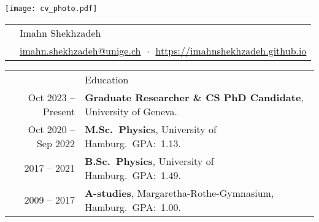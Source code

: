 \documentclass[11pt, a4paper]{article}
\newcommand{\headingfont}{\Large\color{OliveGreen}}
\newenvironment{SectionTable}[1]{
	\renewcommand*{\arraystretch}{1.7}
	\setlength{\tabcolsep}{10pt}
	\begin{longtable}{Rp{5.2in}} & #1 \\}
	{\end{longtable}\vspace{-.3cm}}
\begin{document}
	
	
	\hspace{0.5cm}
	\begin{minipage}{0.1\textwidth}
		\vspace{0.6cm}
		\texttt{[image: cv\_photo.pdf]}
	\end{minipage}
	\hspace{-2.9cm}
	\begin{minipage}{0.9\textwidth}
		\begin{SectionTable}{\Huge Imahn Shekhzadeh} & 
			\href{mailto:imahn.shekhzadeh@unige.ch}{imahn.shekhzadeh@unige.ch} $\;\boldsymbol{\cdot}\;$ \href{https://imahnshekhzadeh.github.io}{https://imahnshekhzadeh.github.io}
		\end{SectionTable}
	\end{minipage}
	
	
	
	
	\begin{SectionTable}{\headingfont Education} 
		
		Oct 2023 -- Present & \textbf{Graduate Researcher \& CS PhD Candidate}, University of Geneva. \\
		
		Oct 2020 -- Sep 2022 & 
		\textbf{M.Sc.~Physics}, University of Hamburg.\ GPA:\ 1.13.\\
		
		2017 -- 2021 & 
		\textbf{B.Sc.~Physics}, University of Hamburg.\ GPA:\ 1.49. \\ 
		
		2009 -- 2017 & 
		\textbf{A-studies}, Margaretha-Rothe-Gymnasium, Hamburg.\ GPA:\ 1.00. \\
		
		
		
	\end{SectionTable}
	
\end{document}
